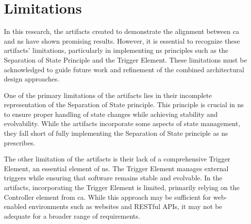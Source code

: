 \section{Limitations}

In this research, the artifacts created to demonstrate the alignment between \gls{ca} and
\gls{ns} have shown promising results. However, it is essential to recognize these
artifacts' limitations, particularly in implementing \gls{ns} principles such as the
Separation of State Principle and the Trigger Element. These limitations must be
acknowledged to guide future work and refinement of the combined architectural design
approaches.

One of the primary limitations of the artifacts lies in their incomplete representation of
the Separation of State principle. This principle is crucial in \gls{ns} to ensure proper
handling of state changes while achieving stability and evolvability. While the artifacts
incorporate some aspects of state management, they fall short of fully implementing the
Separation of State principle as \gls{ns} prescribes. 

The other limitation of the artifacts is their lack of a comprehensive Trigger Element, an
essential element of \gls{ns}. The Trigger Element manages external triggers while
ensuring that software remains stable and evolvable. In the artifacts, incorporating the
Trigger Element is limited, primarily relying on the Controller element from \gls{ca}.
While this approach may be sufficient for web-enabled environments such as websites and
RESTful APIs, it may not be adequate for a broader range of requirements.